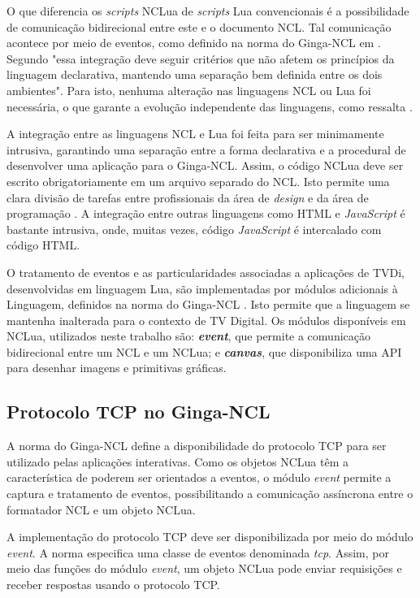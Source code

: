 O que diferencia os \textit{scripts} NCLua de \textit{scripts} Lua convencionais é a possibilidade de comunicação
bidirecional entre este e o documento NCL. Tal comunicação acontece por meio de eventos, como definido
na norma do Ginga-NCL em \cite{abnt200815606}. Segundo \cite{sant2008nclua} 
"essa integração deve seguir critérios que não afetem os princípios da linguagem declarativa, mantendo uma separação bem definida 
entre os dois ambientes". Para isto, nenhuma alteração nas linguagens NCL ou Lua foi necessária, o que garante a evolução
independente das linguagens, como ressalta \cite{sant2008nclua}. 

A integração entre as linguagens NCL e Lua foi feita para ser minimamente intrusiva,
garantindo uma separação entre a forma declarativa e a procedural de desenvolver uma aplicação para o Ginga-NCL.
Assim, o código NCLua deve ser escrito obrigatoriamente em um arquivo separado do NCL. 
Isto permite uma clara divisão de tarefas entre profissionais da área de \textit{design} e da área de programação \cite{sant2008nclua}.
A integração entre outras linguagens como HTML e \textit{JavaScript} é bastante intrusiva, onde, muitas vezes, código \textit{JavaScript} é intercalado
com código HTML.

O tratamento de eventos e as particularidades associadas a aplicações de TVDi, desenvolvidas em linguagem Lua, 
são implementadas por módulos adicionais à Linguagem, definidos na norma do Ginga-NCL \cite{abnt200815606}.
Isto permite que a linguagem se mantenha inalterada para o contexto de TV Digital. 
Os módulos disponíveis em NCLua, utilizados neste trabalho são: \textbf{\textit{event}}, 
que permite a comunicação bidirecional entre um NCL e um NCLua;
e \textbf{\textit{canvas}}, que disponibiliza uma API para desenhar imagens e primitivas gráficas.

\subsection{Protocolo TCP no Ginga-NCL} \label{sec:tcp}

A norma do Ginga-NCL \cite{abnt200815606} define a disponibilidade do protocolo TCP para ser utilizado pelas aplicações interativas.
Como os objetos NCLua têm a característica de poderem ser orientados a eventos, o módulo \textit{event} permite a captura e tratamento de eventos, possibilitando a comunicação assíncrona entre o formatador NCL e um objeto NCLua.

A implementação do protocolo TCP deve ser disponibilizada por meio do módulo \textit{event}. A norma especifica uma classe de eventos 
denominada \textit{tcp}. Assim, por meio das funções do módulo \textit{event}, um objeto NCLua pode enviar 
requisições e receber respostas usando o protocolo TCP.

